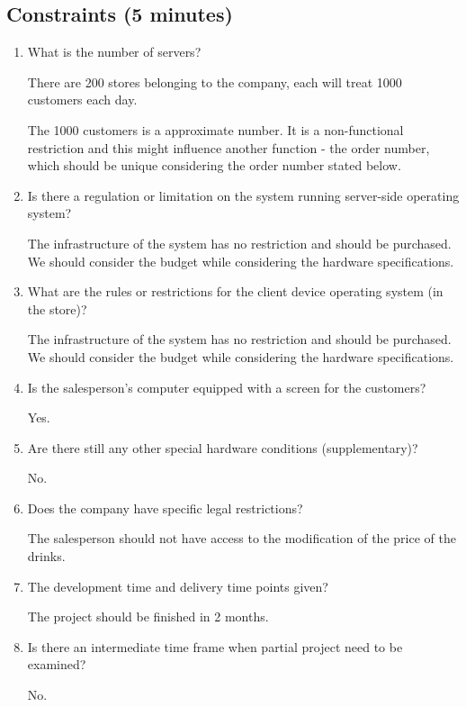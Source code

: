 \documentclass[a4paper]{report}
\begin{document}
\subsection{Constraints (5 minutes)}
\begin{enumerate}
\item What is the number of servers? 
\par
There are 200 stores belonging to the company, each will treat 1000 customers each day. 
\par
The 1000 customers is a approximate number. It is a non-functional restriction and this might influence another function - the order number, which should be unique considering the order number stated below.
\item Is there a regulation or limitation on the system running server-side operating system? 
\par
The infrastructure of the system has no restriction and should be purchased. We should consider the budget while considering the hardware specifications.
\item What are the rules or restrictions for the client device operating system (in the store)? 
\par
The infrastructure of the system has no restriction and should be purchased. We should consider the budget while considering the hardware specifications.
\item Is the salesperson's computer equipped with a screen for the customers?
\par
Yes.
\item Are there still any other special hardware conditions (supplementary)? 
\par
No.
\item Does the company have specific legal restrictions? 
\par
The salesperson should not have access to the modification of the price of the drinks.
\item The development time and delivery time points given? 
\par
The project should be finished in 2 months.
\item Is there an intermediate time frame when partial project need to be examined?
\par
No.
\end{enumerate}
\end{document}
